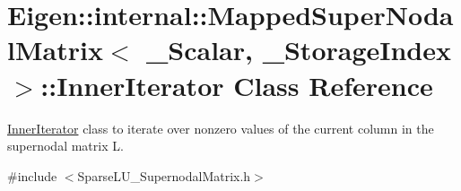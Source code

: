\hypertarget{class_eigen_1_1internal_1_1_mapped_super_nodal_matrix_1_1_inner_iterator}{}\section{Eigen\+:\+:internal\+:\+:Mapped\+Super\+Nodal\+Matrix$<$ \+\_\+\+Scalar, \+\_\+\+Storage\+Index $>$\+:\+:Inner\+Iterator Class Reference}
\label{class_eigen_1_1internal_1_1_mapped_super_nodal_matrix_1_1_inner_iterator}


\hyperlink{class_eigen_1_1internal_1_1_mapped_super_nodal_matrix_1_1_inner_iterator}{Inner\+Iterator} class to iterate over nonzero values of the current column in the supernodal matrix L.  




{\ttfamily \#include $<$Sparse\+L\+U\+\_\+\+Supernodal\+Matrix.\+h$>$}

